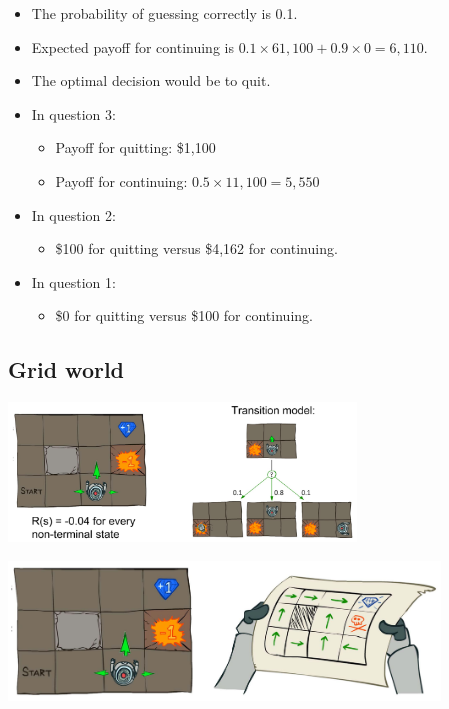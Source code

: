 \documentclass[11pt]{article}
\begin{document}
\begin{itemize}
\item The probability of guessing correctly is 0.1.
\item Expected payoff for continuing is \(0.1 \times 61,100 + 0.9 \times 0 = 6,110\).
\item The optimal decision would be to quit.
\item In question 3:
\begin{itemize}
\item Payoff for quitting: \$1,100
\item Payoff for continuing: \(0.5 \times 11,100 = 5,550\)
\end{itemize}
\item In question 2:
\begin{itemize}
\item \$100 for quitting versus \$4,162 for continuing.
\end{itemize}
\item In question 1:
\begin{itemize}
\item \$0 for quitting versus \$100 for continuing.
\end{itemize}
\end{itemize}

 \newpage
\subsection{Grid world}
\label{sec:orge1034c0}
\begin{center}
\includegraphics[height=10em]{./images/grid-world-image.png}
\end{center}

\begin{center}
\includegraphics[height=10em]{./images/grid-world-policy-image.png}
\end{center}
\end{document}
